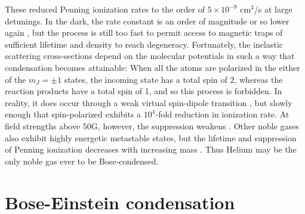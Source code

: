 	These reduced Penning ionization rates to the order of $5\times10^{-9}$ cm$^3$/s at large detunings.
	In the dark, the rate constant is an order of magnitude or so lower again \cite{Mastwijk98}, but the process is  still too fast to permit access to magnetic traps of sufficient lifetime and density to reach degeneracy.
	Fortunately, the inelastic scattering cross-sections depend on the molecular potentials in such a way that condensation becomes attainable: When all the atoms are polarized in the either of the $m_J=\pm1$ states, the incoming state has a total spin of 2, whereas the reaction products have a total spin of 1, and so this process is forbidden.
	In reality, it does occur through a weak virtual spin-dipole transition \cite{Shlyapnikov94} , but slowly enough that spin-polarized \mhe exhibits a $10^4$-fold reduction in ionization rate.
	At field strengths above 50G, however, the suppression weakens \cite{Shlyapnikov94,Borbely12}.
	Other noble gases also exhibit highly energetic metastable states, but the lifetime and suppression of Penning ionization decreases with increasing mass \cite{Orzel99, spoden05}.
	Thus Helium may be the only noble gas ever to be Bose-condensed.
	

	
	
	

\section{Bose-Einstein condensation}

